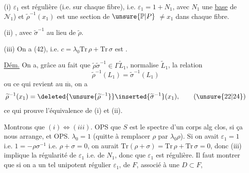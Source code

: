 (i) $\varepsilon_1$ est   régulière (i.e.   sur chaque fibre), i.e. $\varepsilon_1=1+N_1$, avec $N_1$ une \uline{base} de $\mathcal N_1$) et $\widetilde\rho^{-1}(x_1)$ est une section de $\unsure{\mathbb P|P}$  $\ne x_1$ dans chaque fibre.


(ii) , avec $\widetilde\sigma^{-1}$ au lieu de $\widetilde\rho$.


(iii) On a (42), i.e. $c=\lambda_0\mathrm{Tr}\,\rho+\mathrm{Tr}\,\sigma$ est .

\uline{Dém.} On a, grâce au fait que $\widetilde\rho\widetilde\sigma^{-1}\in\Gamma\widetilde L_1$, normalise $\widetilde L_1$,  la relation
\[
\widetilde\rho^{-1}(L_1)=\widetilde\sigma^{-1}(L_1)
\]
ou ce qui revient au $\overline{\mathrm m}$, on a
\[
\widetilde\rho^{-1}(x_1)=\deleted{\unsure{\widetilde\rho^{-1}}}\inserted{\widetilde\sigma^{-1}}(x_1), \tag{\unsure{22|24}}
\]
ce qui prouve l'équivalence de (i) et (ii).

Montrons que $(i)\Longleftrightarrow(iii)$. OPS que $S$ est le spectre d'un corps alg clos, si ça nous arrange, et OPS. $\lambda_0=1$ (quitte  à remplacer $\rho$ par $\lambda_0\rho$). Si on avait $\varepsilon_1=1$ i.e. \deleted{$\rho+\sigma$} $1=-\rho\sigma^{-1}$ i.e. $\rho+\sigma=0$, on aurait  $\mathrm{Tr}(\rho+\sigma)=\mathrm{Tr}\,\rho+\mathrm{Tr}\,\sigma=0$, donc (iii) implique la régularité de $\varepsilon_1$ i.e. de $N_1$,   donc que $\varepsilon_1$ est régulière. Il faut montrer que si on a un tel   unipotent régulier $\varepsilon_1$, de $F$, associé à une $D\subset F$,


